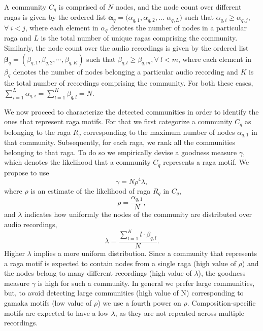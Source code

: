 A community $C_q$ is comprised of $N$ nodes, and the node count over different \glspl{raga} is given by the ordered list ${\boldsymbol{\alpha}_q} = (\alpha_{q,1}, \alpha_{q,2},\dots$ $\alpha_{q,L})$ such that $\alpha_{q,i} \geq \alpha_{q,j}$, $\forall~ i < j$,
where each element in $\alpha_{q}$ denotes the number of nodes in a particular \gls{raga} and $L$ is the total number of unique \glspl{raga} comprising the community. Similarly, the node count over the audio recordings is given by the ordered list ${\boldsymbol{\beta}_q} = (\beta_{q,1}, \beta_{q,2},\cdots,\beta_{q,K})$ such that $\beta_{q,l} \geq \beta_{q,m}, \forall~l < m$,  where each element in $\beta_{q}$ denotes the number of nodes belonging a particular audio recording and $K$ is the total number of recordings comprising the community. For both these cases, $\sum_{i=1}^{L}\alpha_{q,i} = \sum_{l=1}^{K}\beta_{q,l} = N$.

We now proceed to characterize the detected communities in order to identify the ones that represent \gls{raga} motifs. For that we first categorize a community $C_q$ as belonging to the \gls{raga} $R_q$ corresponding to the maximum number of nodes $\alpha_{q,1}$ in that community. Subsequently, for each \gls{raga}, we rank all the communities belonging to that \gls{raga}. To do so we empirically devise a goodness measure $\gamma$, which denotes the likelihood that a community $C_q$ represents a \gls{raga} motif. We propose to use
\vspace{-0.5em}
\begin{equation}
\gamma = N \rho^4 \lambda,
\label{eq:gamma}
\end{equation}
where $\rho$ is an estimate of the likelihood of \gls{raga} $R_q$ in $C_q$, 
\begin{equation}
\rho = \frac{\alpha_{q,1}}{N},
\end{equation}
and $\lambda$ indicates how uniformly the nodes of the community are distributed over audio recordings,
\vspace{-0.5em}
\begin{equation}
\lambda = \frac{\sum_{l=1}^{K}l \cdot \beta_{q,l}}{N}.
\end{equation}
Higher $\lambda$ implies a more uniform distribution. Since a community that represents a \gls{raga} motif is expected to contain nodes from a single \gls{raga} (high value of $\rho$) and the nodes belong to many different recordings (high value of $\lambda$), the goodness measure $\gamma$ is high for such a community. In general we prefer large communities, but, to avoid detecting large communities (high value of N) corresponding to gamaka motifs (low value of $\rho$) we use a fourth power on $\rho$. Composition-specific motifs are expected to have a low $\lambda$, as they are not repeated across multiple recordings.

